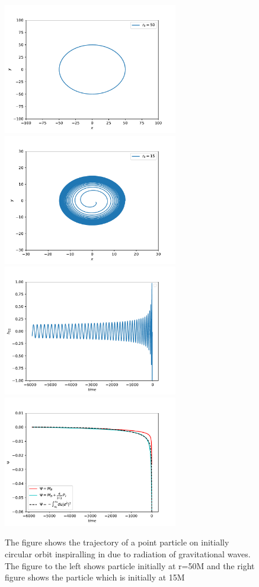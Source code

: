 \documentclass[prd,preprintnumbers,onecolumn,eqsecnum,floatfix,letter]{revtex4}
\begin{document}
\begin{figure}
	\includegraphics[width=3.0in]{../plots/OrbitEOB50.pdf}
	\includegraphics[width=3.0in]{../plots/OrbitEOB15.pdf}
	\includegraphics[width=3.0in]{../plots/h22EOB.pdf}
	\includegraphics[width=3.0in]{../plots/Psi2EOBHamiltonia_BOB.pdf}
	\caption{The figure shows the trajectory of a point particle on initially circular orbit inspiralling in due to radiation of gravitational waves. The figure to the left shows particle initially at r=50M and the right figure shows the particle which is initially at 15M}
	\label{fig:BoBFig}
\end{figure} 
\end{document}
